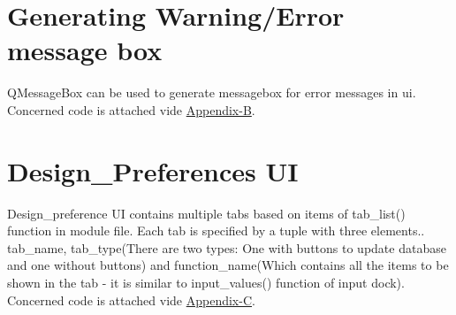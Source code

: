 \documentclass[11pt,a4paper]{report}
\begin{document}
\section{Generating Warning/Error message box}
\noindent QMessageBox can be used to generate messagebox for error messages in ui. Concerned code is attached vide \hyperlink {page.12}{Appendix-B}.

\section{Design\_Preferences UI}
\noindent Design\_preference UI contains multiple tabs based on items of tab\_list() function in module file. Each tab is specified by a tuple with three elements.. tab\_name, tab\_type(There are two types: One with buttons to update database and one without buttons) and function\_name(Which contains all the items to be shown in the tab - it is similar to input\_values() function of input dock). Concerned code is attached vide \hyperlink {page.13}{Appendix-C}.

\nocite{*}
\newpage


\end{document}
